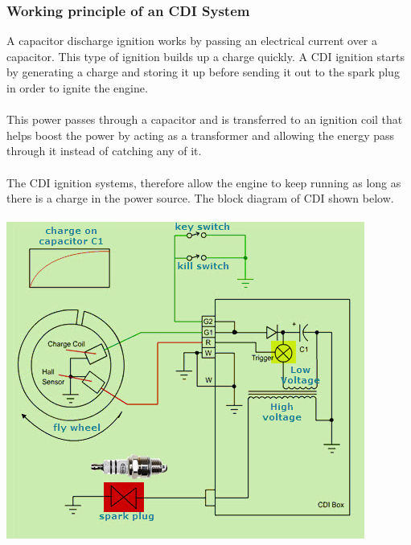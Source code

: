 \documentclass[a4paper]{article}
\begin{document}
\subsubsection{Working principle of an CDI System}
A capacitor discharge ignition works by passing an electrical current over a capacitor.
This type of ignition builds up a charge quickly. 
A CDI ignition starts by generating a charge and storing it up before sending
it out to the spark plug in order to ignite the engine. \\ \\
This power passes through a capacitor and is transferred to an ignition coil that helps
boost the power by acting as a transformer and allowing the energy pass through it instead
of catching any of it. \\ \\
The CDI ignition systems, therefore allow the engine to keep running as long as there is a charge
in the power source. The block diagram of CDI shown below. \\ \\
\includegraphics[scale=0.8]{CDI}
\end{document}
